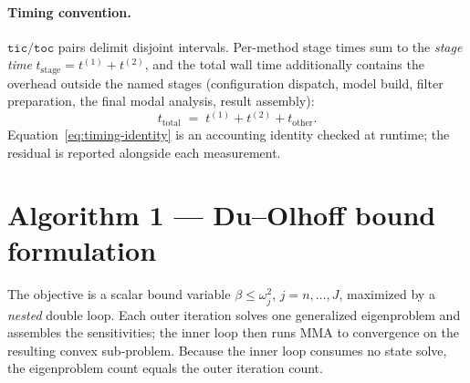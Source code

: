 \paragraph{Timing convention.}
$\texttt{tic}/\texttt{toc}$ pairs delimit disjoint intervals.  Per-method
stage times sum to the \emph{stage time}
$t_{\mathrm{stage}} = t^{(1)} + t^{(2)}$, and the total wall time additionally
contains the overhead outside the named stages (configuration dispatch, model
build, filter preparation, the final modal analysis, result assembly):
\begin{equation}
  t_{\mathrm{total}} \;=\; t^{(1)} + t^{(2)} + t_{\mathrm{other}} .
  \label{eq:timing-identity}
\end{equation}
Equation~\eqref{eq:timing-identity} is an accounting identity checked at
runtime; the residual is reported alongside each measurement.

\section{Algorithm 1 --- Du--Olhoff bound formulation}

The objective is a scalar bound variable $\beta \le \omega_j^2$,
$j = n,\ldots,J$, maximized by a \emph{nested} double loop.  Each outer
iteration solves one generalized eigenproblem and assembles the
sensitivities; the inner loop then runs MMA to convergence on the resulting
convex sub-problem.  Because the inner loop consumes no state solve, the
eigenproblem count equals the outer iteration count.


